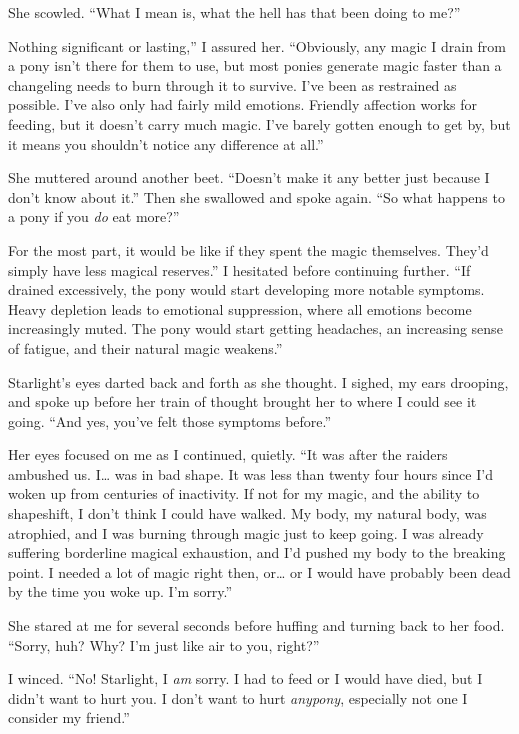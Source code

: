 She scowled. “What I mean is, what the hell has that been doing to me?”

\leavevmode{}Nothing significant or lasting,” I assured her. “Obviously, any magic I drain from a pony isn’t there for them to use, but most ponies generate magic faster than a changeling needs to burn through it to survive. I’ve been as restrained as possible. I’ve also only had fairly mild emotions. Friendly affection works for feeding, but it doesn’t carry much magic. I’ve barely gotten enough to get by, but it means you shouldn’t notice any difference at all.”

She muttered around another beet. “Doesn’t make it any better just because I don’t know about it.” Then she swallowed and spoke again. “So what happens to a pony if you \textit{do} eat more?”

\leavevmode{}For the most part, it would be like if they spent the magic themselves. They’d simply have less magical reserves.” I hesitated before continuing further. “If drained excessively, the pony would start developing more notable symptoms. Heavy depletion leads to emotional suppression, where all emotions become increasingly muted. The pony would start getting headaches, an increasing sense of fatigue, and their natural magic weakens.”

Starlight’s eyes darted back and forth as she thought. I sighed, my ears drooping, and spoke up before her train of thought brought her to where I could see it going. “And yes, you’ve felt those symptoms before.”

Her eyes focused on me as I continued, quietly. “It was after the raiders ambushed us. I… was in bad shape. It was less than twenty four hours since I’d woken up from centuries of inactivity. If not for my magic, and the ability to shapeshift, I don’t think I could have walked. My body, my natural body, was atrophied, and I was burning through magic just to keep going. I was already suffering borderline magical exhaustion, and I’d pushed my body to the breaking point. I needed a lot of magic right then, or… or I would have probably been dead by the time you woke up. I’m sorry.”

She stared at me for several seconds before huffing and turning back to her food. “Sorry, huh? Why? I’m just like air to you, right?”

I winced. “No! Starlight, I \textit{am} sorry. I had to feed or I would have died, but I didn’t want to hurt you. I don’t want to hurt \textit{anypony}, especially not one I consider my friend.”

